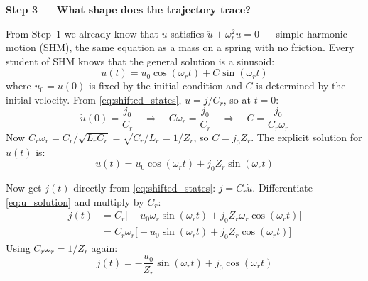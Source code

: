 \documentclass[12pt, a4paper]{article}
\def\,{ }%
\newcommand{\Lr}{L_r}
\newcommand{\Cr}{C_r}
\newcommand{\omegar}{\omega_r}
\newcommand{\Zr}{Z_r}
\begin{document}
\begin{eqnbox}
\medskip
\textbf{Step 3 — What shape does the trajectory trace?}

From Step~1 we already know that $u$ satisfies
$\ddot{u} + \omegar^2 u = 0$ — simple harmonic motion (SHM), the same
equation as a mass on a spring with no friction.
Every student of SHM knows that the general solution is a sinusoid:
\begin{equation*}
    u(t) = u_0 \cos(\omegar t) + C\,\sin(\omegar t)
\end{equation*}
where $u_0 = u(0)$ is fixed by the initial condition and $C$ is determined
by the initial velocity.
From \eqref{eq:shifted_states}, $\dot{u} = j/\Cr$, so at $t=0$:
\begin{equation*}
    \dot{u}(0) = \frac{j_0}{\Cr}
    \quad\Longrightarrow\quad
    C\,\omegar = \frac{j_0}{\Cr}
    \quad\Longrightarrow\quad
    C = \frac{j_0}{\Cr\,\omegar}
\end{equation*}
Now $\Cr\,\omegar = \Cr/\sqrt{\Lr\Cr} = \sqrt{\Cr/\Lr} = 1/\Zr$,
so $C = j_0\Zr$.  The explicit solution for $u(t)$ is:
\begin{equation}
    u(t) = u_0\cos(\omegar t) + j_0\Zr\,\sin(\omegar t)
    \label{eq:u_solution}
\end{equation}

Now get $j(t)$ directly from \eqref{eq:shifted_states}: $j = \Cr\dot{u}$.
Differentiate \eqref{eq:u_solution} and multiply by $\Cr$:
\begin{align*}
    j(t) &= \Cr\bigl[-u_0\,\omegar\sin(\omegar t)
                      + j_0\Zr\,\omegar\cos(\omegar t)\bigr] \\[4pt]
         &= \Cr\,\omegar\bigl[-u_0\sin(\omegar t)
                               + j_0\Zr\cos(\omegar t)\bigr]
\end{align*}
Using $\Cr\,\omegar = 1/\Zr$ again:
\begin{equation}
    j(t) = -\frac{u_0}{\Zr}\sin(\omegar t) + j_0\cos(\omegar t)
    \label{eq:j_solution}
\end{equation}


\end{eqnbox}
\end{document}
